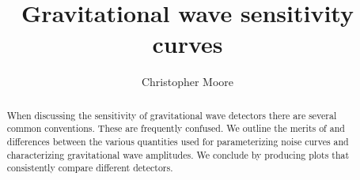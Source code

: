 \documentclass[12pt]{iopart}
\begin{document}
\title{Gravitational wave sensitivity curves}
\author{Christopher Moore}
\address{Institute of Astronomy, University of Cambridge, Madingley Road, Cambridge CB3 0HA}


\begin{abstract}
When discussing the sensitivity of gravitational wave detectors there are several common conventions. These are frequently confused. We outline the merits of and differences between the various quantities used for parameterizing noise curves and characterizing gravitational wave amplitudes. We conclude by producing plots that consistently compare different detectors.
\end{abstract}











\end{document}
